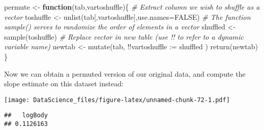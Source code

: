 \documentclass[
]{book}
\newenvironment{Shaded}{\begin{snugshade}}{\end{snugshade}}
\newcommand{\AttributeTok}[1]{\textcolor[rgb]{0.77,0.63,0.00}{#1}}
\newcommand{\CommentTok}[1]{\textcolor[rgb]{0.56,0.35,0.01}{\textit{#1}}}
\newcommand{\ConstantTok}[1]{\textcolor[rgb]{0.00,0.00,0.00}{#1}}
\newcommand{\ControlFlowTok}[1]{\textcolor[rgb]{0.13,0.29,0.53}{\textbf{#1}}}
\newcommand{\DecValTok}[1]{\textcolor[rgb]{0.00,0.00,0.81}{#1}}
\newcommand{\FunctionTok}[1]{\textcolor[rgb]{0.00,0.00,0.00}{#1}}
\newcommand{\NormalTok}[1]{#1}
\newcommand{\OtherTok}[1]{\textcolor[rgb]{0.56,0.35,0.01}{#1}}
\newcommand{\SpecialCharTok}[1]{\textcolor[rgb]{0.00,0.00,0.00}{#1}}
\newcommand{\StringTok}[1]{\textcolor[rgb]{0.31,0.60,0.02}{#1}}
\begin{document}
\begin{Shaded}
\begin{Highlighting}[]
\NormalTok{permute }\OtherTok{\textless{}{-}} \ControlFlowTok{function}\NormalTok{(tab,vartoshuffle)\{}
  \CommentTok{\# Extract column we wish to shuffle as a vector}
\NormalTok{  toshuffle }\OtherTok{\textless{}{-}} \FunctionTok{unlist}\NormalTok{(tab[,vartoshuffle],}\AttributeTok{use.names=}\ConstantTok{FALSE}\NormalTok{)}
  \CommentTok{\# The function sample() serves to randomize the order of elements in a vector}
\NormalTok{  shuffled }\OtherTok{\textless{}{-}} \FunctionTok{sample}\NormalTok{(toshuffle)}
  \CommentTok{\# Replace vector in new table (use !! to refer to a dynamic variable name)}
\NormalTok{  newtab }\OtherTok{\textless{}{-}} \FunctionTok{mutate}\NormalTok{(tab, }\SpecialCharTok{!!}\AttributeTok{vartoshuffle :=}\NormalTok{ shuffled )}
  \FunctionTok{return}\NormalTok{(newtab)}
\NormalTok{\}}
\end{Highlighting}
\end{Shaded}

Now we can obtain a permuted version of our original data, and compute the slope estimate on this dataset instead:

\begin{Shaded}
\end{Shaded}

\texttt{[image: DataScience\_files/figure-latex/unnamed-chunk-72-1.pdf]}

\begin{Shaded}
\end{Shaded}

\begin{verbatim}
##   logBody 
## 0.1126163
\end{verbatim}
\end{document}
